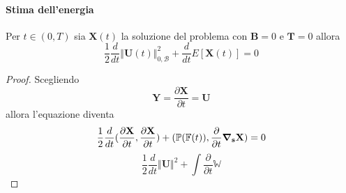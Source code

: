 \paragraph{Stima dell'energia}

Per $t\in (0,T)$ sia $\mathbf{X}(t)$ la soluzione del problema con $\mathbf{B}=0$ e $\mathbf{T}=0$ allora
\begin{equation*}
\frac{1}{2}\frac{d}{dt}\Vert\mathbf{U}(t)\Vert^2_{0,\mathcal{B}}+\frac{d}{dt}E[\mathbf{X}(t)]=0
\end{equation*}
\begin{proof}
Scegliendo
\begin{equation*}
\mathbf{Y}=\frac{\partial \mathbf{X}}{\partial t}=\mathbf{U}
\end{equation*}
allora l'equazione diventa
\begin{equation*}
\frac{1}{2}\frac{d}{dt}\ps{\frac{\partial\mathbf{X}}{\partial t}}{\frac{\partial \mathbf{X}}{\partial t}} + \ps{\mathbb{P}(\mathbb{F}(t))}{\frac{\partial}{\partial t} \Nabla_\mathbf{s} \mathbf{X}} = 0
\end{equation*}
\begin{equation*}
\frac{1}{2}\frac{d}{dt}\Vert\mathbf{U}\Vert^2 +\int\frac{\partial}{\partial t}\mathbb{W}\end{equation*}
\end{proof}
